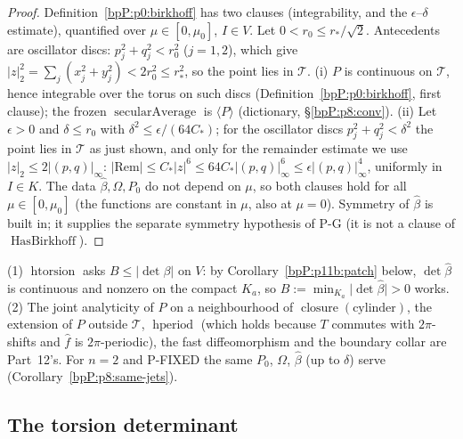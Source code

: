 \begin{proof}
\label{stepP:p11b:bt-frozen} Definition~\ref{bpP:p0:birkhoff} has two clauses (integrability, and the $\epsilon$--$\delta$ estimate), quantified over $\mu\in[0,\mu_0]$, $I\in V$. Let $0<r_0\le r_*/\sqrt2$. Antecedents are oscillator discs: $p_j^2+q_j^2<r_0^2$ ($j=1,2$), which give $\lvert z\rvert_2^2=\sum_j(x_j^2+y_j^2)<2r_0^2\le r_*^2$, so the point lies in $\mathcal T$. (i) $P$ is continuous on $\mathcal T$, hence integrable over the torus on such discs (Definition~\ref{bpP:p0:birkhoff}, first clause); the frozen $\operatorname{secularAverage}$ is $\langle P\rangle$ (dictionary, \S\ref{bpP:p8:conv}). (ii) Let $\epsilon>0$ and $\delta\le r_0$ with $\delta^2\le\epsilon/(64C_*)$; for the oscillator discs $p_j^2+q_j^2<\delta^2$ the point lies in $\mathcal T$ as just shown, and only for the remainder estimate we use $\lvert z\rvert_2\le2\lvert(p,q)\rvert_\infty$: $\lvert\mathrm{Rem}\rvert\le C_*\lvert z\rvert^6\le64C_*\lvert(p,q)\rvert_\infty^6\le\epsilon\lvert(p,q)\rvert_\infty^4$, uniformly in $I\in K$. The data $\hat\beta,\Omega,P_0$ do not depend on $\mu$, so both clauses hold for all $\mu\in[0,\mu_0]$ (the functions are constant in $\mu$, also at $\mu=0$). Symmetry of $\hat\beta$ is built in; it supplies the separate symmetry hypothesis of P-G (it is not a clause of $\operatorname{HasBirkhoff}$).
\end{proof}

\begin{remark}\label{bpP:p11b:remain}
(1) $\operatorname{htorsion}$ asks $B\le\lvert\det\beta\rvert$ on $V$: by Corollary~\ref{bpP:p11b:patch} below, $\det\hat\beta$ is continuous and nonzero on the compact $K_a$, so $B:=\min_{K_a}\lvert\det\hat\beta\rvert>0$ works. (2) The joint analyticity of $P$ on a neighbourhood of $\operatorname{closure}(\text{cylinder})$, the extension of $P$ outside $\mathcal T$, $\operatorname{hperiod}$ (which holds because $T$ commutes with $2\pi$-shifts and $\hat f$ is $2\pi$-periodic), the fast diffeomorphism and the boundary collar are Part~12's. For $n=2$ and P-FIXED the same $P_0$, $\Omega$, $\hat\beta$ (up to $\delta$) serve (Corollary~\ref{bpP:p8:same-jets}).
\end{remark}

\subsection{The torsion determinant}\label{bpP:p11b:sec-det}

